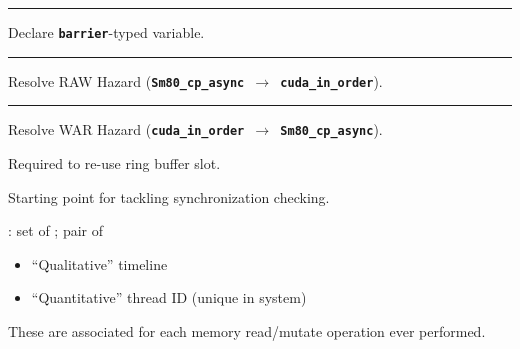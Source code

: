 \newpage
{}

{\large

}

\vspace{3mm}
\hrule

{\LARGE
Declare \textbf{\texttt{barrier}}-typed variable.

}

\newpage
{}

{\large

}

\vspace{3mm}
\hrule

{\LARGE
Resolve RAW Hazard (\textbf{\texttt{Sm80\_cp\_async $\to$ cuda\_in\_order}}).

}

\newpage
{}

{\large

}

\vspace{3mm}
\hrule

{\LARGE
Resolve WAR Hazard (\textbf{\texttt{cuda\_in\_order $\to$ Sm80\_cp\_async}}).

Required to re-use ring buffer slot.

}

\newpage
{}

{\LARGE
Starting point for tackling synchronization checking.

\vspace{5mm}

: set of ; pair of
\begin{itemize}
  \item ``Qualitative'' timeline
  \item ``Quantitative'' thread ID (unique in system)
\end{itemize}

\vspace{5mm}

These are associated for each memory read/mutate operation ever performed.

}


\newpage
{}


